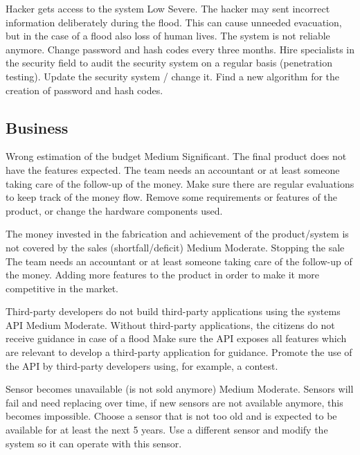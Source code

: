 {Hacker gets access to the system}
{Low}
{Severe. The hacker may sent incorrect information deliberately during the flood. This can cause unneeded evacuation, but in the case of a flood also loss of human lives. The system is not reliable anymore.}
{Change password and hash codes every three months. Hire specialists in the security field to audit the security system on a regular basis (penetration testing).}
{Update the security system / change it. Find a new algorithm for the creation of password and hash codes.}



\subsection{Business}

{Wrong estimation of the budget}
{Medium}
{Significant. The final product does not have the features expected.}
{The team needs an accountant or at least someone taking care of the follow-up of the money. Make sure there are regular evaluations to keep track of the money flow.}
{Remove some requirements or features of the product, or change the hardware components used.}

{The money invested in the fabrication and achievement of the product/system is not covered by the sales (shortfall/deficit)}
{Medium}
{Moderate. Stopping the sale}
{The team needs an accountant or at least someone taking care of the follow-up of the money.}
{Adding more features to the product in order to make it more competitive in the market.}

{Third-party developers do not build third-party applications using the systems API}
{Medium}
{Moderate. Without third-party applications, the citizens do not receive guidance in case of a flood}
{ Make sure the API exposes all features which are relevant to develop a third-party application for guidance. }
{ Promote the use of the API by third-party developers using, for example, a contest. }

	
{Sensor becomes unavailable (is not sold anymore)}
{Medium}
{Moderate. Sensors will fail and need replacing over time, if new sensors are not available anymore, this becomes impossible.}
{ Choose a sensor that is not too old and is expected to be available for at least the next 5 years. }
{ Use a different sensor and modify the system so it can operate with this sensor. }	

